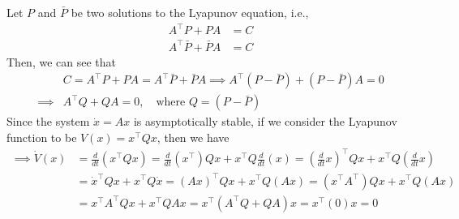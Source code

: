 Let \( P \) and \( \bar{P} \) be two solutions to the Lyapunov equation, i.e.,
\begin{align*}
    A^\top P + P A
     & =
    C
    \\
    A^\top \bar{P} + \bar{P} A
     & =
    C
\end{align*}
Then, we can see that
\begin{align*}
     &
    C
    =
    A^\top P + P A
    =
    A^\top \bar{P} + \bar{P} A
    \implies
    A^\top (P - \bar{P}) + (P - \bar{P}) A
    =
    0
    \\
    \implies
     &
    A^\top Q + Q A
    =
    0,
    \quad \text{where } Q = (P - \bar{P})
\end{align*}
Since the system \( \dot x = A x \) is asymptotically stable, if we consider the Lyapunov function to be \( V(x) = x^\top Q x \), then we have
\begin{align*}
    \implies
    \dot V(x)
     & =
    \frac{d}{dt} \left( x^\top Q x \right)
    =
    \frac{d}{dt} \left( x^\top \right) Q x + x^\top Q \frac{d}{dt} \left( x \right)
    =
    {\left(\frac{d}{dt} x \right)}^\top Q x + x^\top Q {\left(\frac{d}{dt} x \right)}
    \\ & =
    {\dot x}^\top Q x + x^\top Q \dot x
    =
    {\left( A x \right)}^\top Q x + x^\top Q \left( A x \right)
    =
    \left( x^\top A^\top \right) Q x + x^\top Q \left( A x \right)
    \\ & =
    x^\top A^\top Q x + x^\top Q A x
    =
    x^\top \left( A^\top Q + Q A \right) x
    =
    x^\top \left( 0 \right) x
    =
    0
\end{align*}
